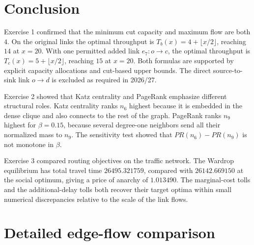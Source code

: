\documentclass[11pt,a4paper]{article}
\begin{document}
\section{Conclusion}

Exercise 1 confirmed that the minimum cut capacity and maximum flow are both \(4\).
On the original links the optimal throughput is
\(T_b(x)=4+\lfloor x/2\rfloor\), reaching \(14\) at \(x=20\).
With one permitted added link \(e_7:o\to c\), the optimal throughput is
\(T_c(x)=5+\lfloor x/2\rfloor\), reaching \(15\) at \(x=20\).
Both formulas are supported by explicit capacity allocations and cut-based upper bounds.
The direct source-to-sink link \(o\to d\) is excluded as required in 2026/27.

Exercise 2 showed that Katz centrality and PageRank emphasize different
structural roles. Katz centrality ranks \(n_6\) highest because it is embedded
in the dense clique and also connects to the rest of the graph. PageRank ranks
\(n_9\) highest for \(\beta=0.15\), because several degree-one neighbors send
all their normalized mass to \(n_9\). The sensitivity test showed that
\(PR(n_6)-PR(n_9)\) is not monotone in \(\beta\).

Exercise 3 compared routing objectives on the traffic network. The Wardrop
equilibrium has total travel time \(26495.321759\), compared with
\(26142.669150\) at the social optimum, giving a price of anarchy of
\(1.013490\). The marginal-cost tolls and the additional-delay tolls both
recover their target optima within small numerical discrepancies relative to
the scale of the link flows.

\appendix



\section{Detailed edge-flow comparison}
\end{document}
